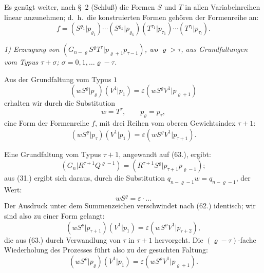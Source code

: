 \documentclass[12pt,a4paper]{article}
\begin{document}
Es genügt weiter, nach \S\ 2 (Schluß) die Formen $S$ und $T$ in allen Variabelnreihen linear anzunehmen; d.\ h.\ die konstruierten Formen gehören der Formenreihe an:
\begin{equation*}
f = (S^{\varrho_{1}} | p_{\varrho_{1}}) \cdots (S^{\varrho_{k}} | p_{\varrho_{k}}) (T^{\tau_{1}} | p_{\tau_{1}}) \cdots (T^{\tau_{l}} | p_{\tau_{l}}).
\end{equation*}

\textit{1) Erzeugung von $(G_{n-\varrho} S^{\varrho} T^{\tau} | p_{\varrho+1} p_{\tau-1})$, wo $\varrho > \tau$, aus Grundfaltungen vom Typus $\tau+\sigma$; $\sigma = 0, 1, \ldots \varrho-\tau$.}

Aus der Grundfaltung vom Typus $1$
\begin{equation*}
(w S^{\varrho} | p_{\varrho}) (V^{1} | p_{1}) = \varepsilon (w S^{\varrho} V^{1} | p_{\varrho+1})
\end{equation*}
erhalten wir durch die Substitution
\begin{equation*}
w = T^{\tau}, \qquad p_{\varrho} = p_{\tau},
\end{equation*}
eine Form der Formenreihe $f$, mit drei Reihen vom oberen Gewichtsindex $\tau+1$:
\begin{equation}\tag{63}
(w S^{\varrho} | p_{\tau}) (V^{1} | p_{1}) = \varepsilon (w S^{\varrho} V^{1} | p_{\tau+1}).
\end{equation}

Eine Grundfaltung vom Typus $\tau+1$, angewandt auf (63.), ergibt:
\begin{equation*}
(G_{n} | R^{\tau+1} Q^{\varrho-1}) = (R^{\tau+1} S^{\varrho} | p_{\tau+1} p_{\varrho-1});
\end{equation*}
aus (31.) ergibt sich daraus, durch die Substitution $q_{n-\varrho-1} w = q_{n-\varrho-1}$, der Wert:
\begin{equation*}
w S^{\varrho} = \varepsilon \cdot \ldots
\end{equation*}
Der Ausdruck unter dem Summenzeichen verschwindet nach (62.) identisch; wir sind also zu einer Form gelangt:
\begin{equation*}
(w S^{\varrho} | p_{\tau+1}) (V^{1} | p_{1}) = \varepsilon (w S^{\varrho} V^{1} | p_{\tau+2}),
\end{equation*}
die aus (63.) durch Verwandlung von $\tau$ in $\tau+1$ hervorgeht. Die $(\varrho-\tau)$-fache Wiederholung des Prozesses führt also zu der gesuchten Faltung:
\begin{equation*}
(w S^{\varrho} | p_{\varrho}) (V^{1} | p_{1}) = \varepsilon (w S^{\varrho} V^{1} | p_{\varrho+1}).
\end{equation*}
\end{document}
